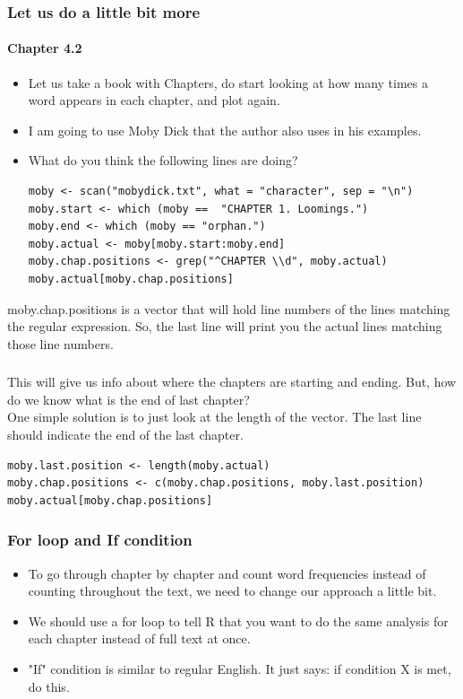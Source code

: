 \documentclass{beamer}
\begin{document}
\begin{frame}[fragile]
\frametitle{Let us do a little bit more}
\framesubtitle{Chapter 4.2}
\begin{itemize}
\item Let us take a book with Chapters, do start looking at how many times a word appears in each chapter, and plot again.
\item I am going to use Moby Dick that the author also uses in his examples. \pause
\item What do you think the following lines are doing?
\tiny
\begin{verbatim}
moby <- scan("mobydick.txt", what = "character", sep = "\n")
moby.start <- which (moby ==  "CHAPTER 1. Loomings.")
moby.end <- which (moby == "orphan.")
moby.actual <- moby[moby.start:moby.end]
moby.chap.positions <- grep("^CHAPTER \\d", moby.actual)
moby.actual[moby.chap.positions]
\end{verbatim}
\end{itemize}
\pause \normalsize moby.chap.positions is a vector that will hold line numbers of the lines matching the regular expression. So, the last line will print you the actual lines matching those line numbers. 
\end{frame}

\begin{frame}[fragile]
\frametitle{}
This will give us info about where the chapters are starting and ending.  But, how do we know what is the end of last chapter? \pause 
\\ One simple solution is to just look at the length of the vector. The last line should indicate the end of the last chapter. 
\tiny \begin{verbatim}
moby.last.position <- length(moby.actual)
moby.chap.positions <- c(moby.chap.positions, moby.last.position)
moby.actual[moby.chap.positions]
\end{verbatim}
\end{frame}

\begin{frame}
\frametitle{For loop and If condition}
\begin{itemize}
\item To go through chapter by chapter and count word frequencies instead of counting throughout the text, we need to change our approach a little bit.
\item We should use a for loop to tell R that you want to do the same analysis for each chapter instead of full text at once. \pause
\item "If" condition is similar to regular English. It just says: if condition X is met, do this.
\end{itemize}
\end{frame}
\end{document}
